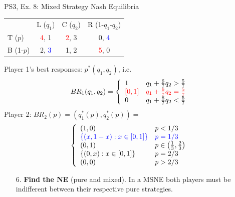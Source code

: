 \begin{frame}{PS3, Ex. 8: Mixed Strategy Nash Equilibria}
  \begin{multicols}{2}
    \begin{table}
      \begin{tabular}{l|c|c|c|}
          \multicolumn{1}{c}{}  & \multicolumn{1}{c}{L ($q_1$)} & \multicolumn{1}{c}{C ($q_2$)} & \multicolumn{1}{c}{R (1-$q_1$-$q_2$)} \\\cline{2-4}
          T ($p$)   & \textcolor{red}{4}, 1 & \textcolor{red}{2}, 3 & 0, \textcolor{blue}{4} \\\cline{2-4}
          B (1-$p$) & 2, \textcolor{blue}{3} & 1, 2 & \textcolor{red}{5}, 0 \\\cline{2-4}
      \end{tabular}
    \end{table}
    Player 1's best responses: $p^{*}(q_1,q_2)$, i.e.
    \begin{align*}
      BR_1(q_1,q_2)=
      \left\{ \begin{array}{ll}
          1                 & q_1 + \frac{6}{7}q_2 > \frac{5}{7}\\
          \textcolor{red}{\left[0,1\right]}  & \textcolor{red}{q_1 + \frac{6}{7}q_2 = \frac{5}{7}}\\
          0                 & q_1 + \frac{6}{7}q_2 < \frac{5}{7}
      \end{array}\right.
    \end{align*}
    Player 2: $BR_2(p)=\left(q_1^{*}(p),q_2^{*}(p)\right)=$
    \begin{align*}
      \left\{ \begin{array}{ll}
          (1,0)                 & p < 1/3 \\
          \textcolor{blue}{\{(x,1-x):x\in[0,1]\}} & \textcolor{blue}{p = 1/3} \\
          (0,1)                 & p\in\left(\frac{1}{3},\frac{2}{3}\right)\\
          \{(0,x):x\in[0,1]\}   & p = 2/3 \\
          (0,0)                 & p > 2/3
      \end{array}\right.
    \end{align*}
  \vfill\null \columnbreak
    \begin{itemize}
      \item[6.] \textbf{Find the NE} (pure and mixed). In a MSNE both players must be indifferent between their respective pure strategies.
    \end{itemize}

\end{multicols}
\end{frame}
